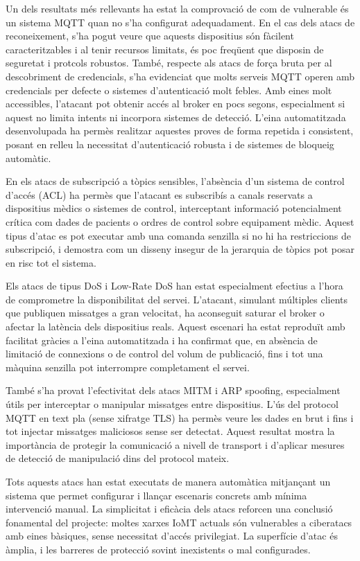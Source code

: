 Un dels resultats més rellevants ha estat la comprovació de com de vulnerable és un sistema MQTT quan no s’ha configurat adequadament. En el cas dels atacs de reconeixement, s'ha pogut veure que aquests dispositius són fàcilent caracteritzables i al tenir recursos limitats, és poc freqüent que disposin de seguretat i protcols robustos. També, respecte als atacs de força bruta per al descobriment de credencials, s’ha evidenciat que molts serveis MQTT operen amb credencials per defecte o sistemes d’autenticació molt febles. Amb eines molt accessibles, l’atacant pot obtenir accés al broker en pocs segons, especialment si aquest no limita intents ni incorpora sistemes de detecció. L’eina automatitzada desenvolupada ha permès realitzar aquestes proves de forma repetida i consistent, posant en relleu la necessitat d’autenticació robusta i de sistemes de bloqueig automàtic.

En els atacs de subscripció a tòpics sensibles, l’absència d’un sistema de control d’accés (ACL) ha permès que l’atacant es subscribís a canals reservats a dispositius mèdics o sistemes de control, interceptant informació potencialment crítica com dades de pacients o ordres de control sobre equipament mèdic. Aquest tipus d’atac es pot executar amb una comanda senzilla si no hi ha restriccions de subscripció, i demostra com un disseny insegur de la jerarquia de tòpics pot posar en risc tot el sistema.

Els atacs de tipus DoS i Low-Rate DoS han estat especialment efectius a l’hora de comprometre la disponibilitat del servei. L’atacant, simulant múltiples clients que publiquen missatges a gran velocitat, ha aconseguit saturar el broker o afectar la latència dels dispositius reals. Aquest escenari ha estat reproduït amb facilitat gràcies a l’eina automatitzada i ha confirmat que, en absència de limitació de connexions o de control del volum de publicació, fins i tot una màquina senzilla pot interrompre completament el servei.

També s’ha provat l’efectivitat dels atacs MITM i ARP spoofing, especialment útils per interceptar o manipular missatges entre dispositius. L’ús del protocol MQTT en text pla (sense xifratge TLS) ha permès veure les dades en brut i fins i tot injectar missatges maliciosos sense ser detectat. Aquest resultat mostra la importància de protegir la comunicació a nivell de transport i d’aplicar mesures de detecció de manipulació dins del protocol mateix.

Tots aquests atacs han estat executats de manera automàtica mitjançant un sistema que permet configurar i llançar escenaris concrets amb mínima intervenció manual. La simplicitat i eficàcia dels atacs reforcen una conclusió fonamental del projecte: moltes xarxes IoMT actuals són vulnerables a ciberatacs amb eines bàsiques, sense necessitat d'accés privilegiat. La superfície d’atac és àmplia, i les barreres de protecció sovint inexistents o mal configurades.


